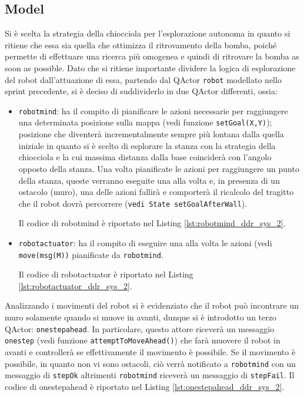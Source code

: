 \subsection{Model}
Si è scelta la strategia della chiocciola per l'esplorazione autonoma in quanto si ritiene che essa sia quella che ottimizza il ritrovamento della bomba, poiché permette di effettuare una ricerca più omogenea e quindi di ritrovare la bomba as soon as possible.
Dato che si ritiene importante dividere la logica di esplorazione del robot dall'attuazione di essa, partendo dal QActor \texttt{robot} modellato nello sprint precedente, si è deciso di suddividerlo in due QActor differenti, ossia:
\begin{itemize}
    \item \texttt{robotmind}: ha il compito di pianificare le azioni necessarie per raggiungere una determinata posizione sulla mappa (vedi funzione \texttt{setGoal(X,Y)}); posizione che diventerà incrementalmente sempre più lontana dalla quella iniziale in quanto si è scelto di esplorare la stanza con la strategia della chiocciola e la cui massima distanza dalla base coinciderà con l'angolo opposto della stanza. Una volta pianificate le azioni per raggiungere un punto della stanza, queste verranno eseguite una alla volta e, in presenza di un ostacolo (muro), una delle azioni fallirà e comporterà il ricalcolo del tragitto che il robot dovrà percorrere (\texttt{vedi State setGoalAfterWall}). 
    
    Il codice di robotmind è riportato nel Listing \ref{lst:robotmind_ddr_sys_2}.
    \item \texttt{robotactuator}: ha il compito di eseguire una alla volta le azioni (vedi \texttt{move(msg(M))} pianificate da \texttt{robotmind}. 
    
    Il codice di robotactuator è riportato nel Listing \ref{lst:robotactuator_ddr_sys_2}.

\end{itemize}
Analizzando i movimenti del robot si è evidenziato che il robot può incontrare un muro solamente quando si muove in avanti, dunque si è introdotto un terzo QActor: \texttt{onestepahead}. In particolare, questo attore riceverà un messaggio \texttt{onestep} (vedi funzione \texttt{attemptToMoveAhead()}) che farà muovere il robot in avanti e controllerà se effettivamente il movimento è possibile. Se il movimento è possibile, in quanto non vi sono ostacoli, ciò verrà notificato a \texttt{robotmind} con un messaggio di \texttt{stepOk} altrimenti \texttt{robotmind} riceverà un messaggio di \texttt{stepFail}.
Il codice di onestepahead è riportato nel Listing \ref{lst:onestepahead_ddr_sys_2}.

